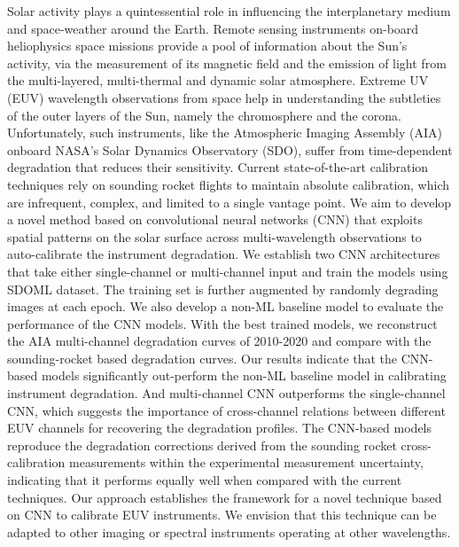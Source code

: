 \documentclass{aa}
\begin{document}
\abstract
{Solar activity plays a quintessential role in influencing the interplanetary medium and space-weather around the Earth. Remote sensing instruments on-board heliophysics space missions provide a pool of information about the Sun’s activity, via the measurement of its magnetic field and the emission of light from the multi-layered, multi-thermal and dynamic solar atmosphere. Extreme UV (EUV) wavelength observations from space help in understanding the subtleties of the outer layers of the Sun, namely the chromosphere and the corona. Unfortunately, such instruments, like the Atmospheric Imaging Assembly (AIA) onboard NASA’s Solar Dynamics Observatory (SDO), suffer from time-dependent degradation that reduces their sensitivity. Current state-of-the-art calibration techniques rely on sounding rocket flights to maintain absolute calibration, which are infrequent, complex, and limited to a single vantage point.}
{We aim to develop a novel method based on convolutional neural networks (CNN) that exploits spatial patterns on the solar surface across multi-wavelength observations to auto-calibrate the instrument degradation.}
{We establish two CNN architectures that take either single-channel or multi-channel input and train the models using SDOML dataset. The training set is further augmented by randomly degrading images at each epoch. We also develop a non-ML baseline model to evaluate the performance of the CNN models. With the best trained models, we reconstruct the AIA multi-channel degradation curves of 2010-2020 and compare with the sounding-rocket based degradation curves. }
{Our results indicate that the CNN-based models significantly out-perform the non-ML baseline model in calibrating instrument degradation. And multi-channel CNN outperforms the single-channel CNN, which suggests the importance of cross-channel relations between different EUV channels for recovering the degradation profiles. The CNN-based models reproduce the degradation corrections derived from the sounding rocket cross-calibration measurements within the experimental measurement uncertainty, indicating that it performs equally well when compared with the current techniques.}
{Our approach establishes the framework for a novel technique based on CNN to calibrate EUV instruments. We envision that this technique can be adapted to other imaging or spectral instruments operating at other wavelengths.}


\end{document}
